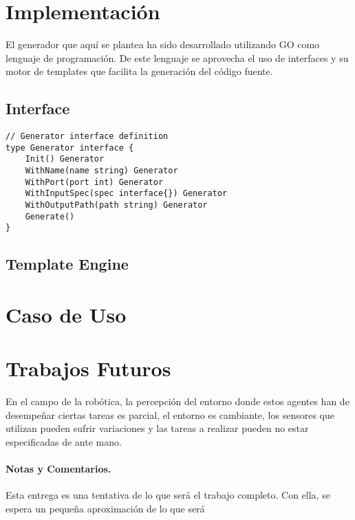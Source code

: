 \documentclass{svproc}
\begin{document}
\section{Implementación}

El generador que aquí se plantea ha sido desarrollado utilizando GO como lenguaje de programación. De este lenguaje se aprovecha el uso de interfaces y  su motor de templates que facilita la generación del código fuente.  

\subsection{Interface}

\begin{lstlisting}
// Generator interface definition
type Generator interface {
	Init() Generator
	WithName(name string) Generator
	WithPort(port int) Generator
	WithInputSpec(spec interface{}) Generator
	WithOutputPath(path string) Generator
	Generate()
}
\end{lstlisting}


\subsection{Template Engine}


\section{Caso de Uso}
\section{Trabajos Futuros}

En el campo de la robótica, la percepción del entorno donde estos agentes han de desempeñar ciertas tareas es parcial, el entorno es cambiante, los sensores que utilizan pueden sufrir variaciones y las tareas a realizar pueden no estar especificadas de ante mano. 




\paragraph{Notas y Comentarios.}
Esta entrega es una tentativa de lo que será el trabajo completo. Con ella, se espera un pequeña aproximación de lo que será
\end{document}
